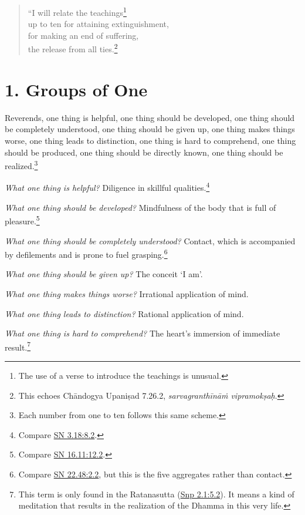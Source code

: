 \documentclass[12pt,openany]{book}%
\begin{document}
\begin{verse}%
“I will relate the teachings\footnote{The use of a verse to introduce the teachings is unusual. } \\
up to ten for attaining extinguishment, \\
for making an end of suffering, \\
the release from all ties.\footnote{This echoes \textsanskrit{Chāndogya} \textsanskrit{Upaniṣad} 7.26.2, \textit{\textsanskrit{sarvagranthīnāṁ} \textsanskrit{vipramokṣaḥ}}. } 

%
\end{verse}

\section*{1. Groups of One }

Reverends, one thing is helpful, one thing should be developed, one thing should be completely understood, one thing should be given up, one thing makes things worse, one thing leads to distinction, one thing is hard to comprehend, one thing should be produced, one thing should be directly known, one thing should be realized.\footnote{Each number from one to ten follows this same scheme. } 

\emph{What one thing is helpful?} Diligence in skillful qualities.\footnote{Compare \href{https://suttacentral.net/sn3.18/en/sujato\#8.2}{SN 3.18:8.2}. } 

\emph{What one thing should be developed?} Mindfulness of the body that is full of pleasure.\footnote{Compare \href{https://suttacentral.net/sn16.11/en/sujato\#12.2}{SN 16.11:12.2}. } 

\emph{What one thing should be completely understood?} Contact, which is accompanied by defilements and is prone to fuel grasping.\footnote{Compare \href{https://suttacentral.net/sn22.48/en/sujato\#2.2}{SN 22.48:2.2}, but this is the five aggregates rather than contact. } 

\emph{What one thing should be given up?} The conceit ‘I am’. 

\emph{What one thing makes things worse?} Irrational application of mind. 

\emph{What one thing leads to distinction?} Rational application of mind. 

\emph{What one thing is hard to comprehend?} The heart’s immersion of immediate result.\footnote{This term is only found in the Ratanasutta (\href{https://suttacentral.net/snp2.1/en/sujato\#5.2}{Snp 2.1:5.2}). It means a kind of meditation that results in the realization of the Dhamma in this very life. } 
\end{document}
